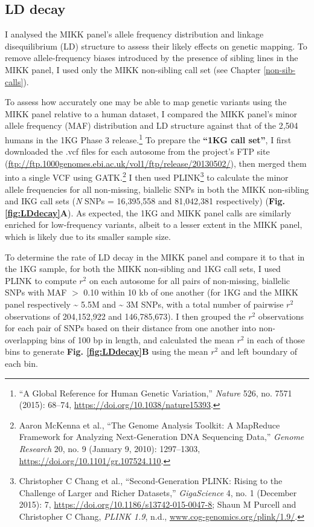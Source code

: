 \documentclass[
]{book}
\begin{document}
\hypertarget{ld-decay-sec}{%
\subsection{LD decay}\label{ld-decay-sec}}

I analysed the MIKK panel's allele frequency distribution and linkage disequilibrium (LD) structure to assess their likely effects on genetic mapping. To remove allele-frequency biases introduced by the presence of sibling lines in the MIKK panel, I used only the MIKK non-sibling call set (see Chapter \ref{non-sib-calls}).

To assess how accurately one may be able to map genetic variants using the MIKK panel relative to a human dataset, I compared the MIKK panel's minor allele frequency (MAF) distribution and LD structure against that of the 2,504 humans in the 1KG Phase 3 release.\footnote{{``A Global Reference for Human Genetic Variation,''} \emph{Nature} 526, no. 7571 (2015): 68--74, \url{https://doi.org/10.1038/nature15393}.} To prepare the \textbf{``1KG call set''}, I first downloaded the .vcf files for each autosome from the project's FTP site (\url{ftp://ftp.1000genomes.ebi.ac.uk/vol1/ftp/release/20130502/}), then merged them into a single VCF using GATK.\footnote{Aaron McKenna et al., {``The {Genome Analysis Toolkit}: {A MapReduce} Framework for Analyzing Next-Generation {DNA} Sequencing Data,''} \emph{Genome Research} 20, no. 9 (January 9, 2010): 1297--1303, \url{https://doi.org/10.1101/gr.107524.110}.} I then used PLINK\footnote{Christopher C Chang et al., {``Second-Generation {PLINK}: Rising to the Challenge of Larger and Richer Datasets,''} \emph{GigaScience} 4, no. 1 (December 2015): 7, \url{https://doi.org/10.1186/s13742-015-0047-8}; Shaun M Purcell and Christopher C Chang, \emph{{PLINK} 1.9}, n.d., \href{https://www.cog-genomics.org/plink/1.9/}{www.cog-genomics.org/plink/1.9/}.} to calculate the minor allele frequencies for all non-missing, biallelic SNPs in both the MIKK non-sibling and IKG call sets (\emph{N} SNPs = 16,395,558 and 81,042,381 respectively) (\textbf{Fig. \ref{fig:LDdecay}A}). As expected, the 1KG and MIKK panel calls are similarly enriched for low-frequency variants, albeit to a lesser extent in the MIKK panel, which is likely due to its smaller sample size.

To determine the rate of LD decay in the MIKK panel and compare it to that in the 1KG sample, for both the MIKK non-sibling and 1KG call sets, I used PLINK to compute \(r^2\) on each autosome for all pairs of non-missing, biallelic SNPs with MAF \(>\) 0.10 within 10 kb of one another (for 1KG and the MIKK panel respectively \textasciitilde{} 5.5M and \textasciitilde{} 3M SNPs, with a total number of pairwise \(r^2\) observations of 204,152,922 and 146,785,673). I then grouped the \(r^2\) observations for each pair of SNPs based on their distance from one another into non-overlapping bins of 100 bp in length, and calculated the mean \(r^2\) in each of those bins to generate \textbf{Fig. \ref{fig:LDdecay}B} using the mean \(r^2\) and left boundary of each bin.
\end{document}

